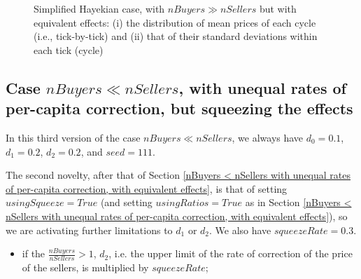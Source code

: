 \documentclass[10pt]{report}
\begin{document}
\begin{appendices}
\begin{figure}[H]
\begin{center}
\caption{Simplified Hayekian case, with $nBuyers \gg nSellers$ but with equivalent effects: (i) the distribution of mean prices of each cycle (i.e., tick-by-tick) and (ii) that of their standard deviations within each tick (cycle)}
\label{output_3_3bb.png}
\end{center}
\end{figure}


\subsection{Case $nBuyers \ll nSellers$, with unequal rates of per-capita correction, but squeezing the effects}\label{nBuyers < nSellerswith unequal rates of per-capita correction, but squeezing the effects}

In this third version of the case $nBuyers \ll nSellers$, we always have $d_0=0.1$, $d_1=0.2$,  $d_2=0.2$, and $seed=111$.

The second novelty, after that of Section \ref{nBuyers < nSellers with unequal rates of per-capita correction, with equivalent effects}, is that of setting $usingSqueeze=True$ (and setting $usingRatios=True$ as in Section  \ref{nBuyers < nSellers with unequal rates of per-capita correction, with equivalent effects}), so we are activating further limitations to $d_1$ or $d_2$. We also have $squeezeRate=0.3$.

\begin{itemize}

\item if the $\frac{nBuyers}{nSellers}>1$, $d_2$, i.e. the upper limit of the rate of correction of the price of the sellers, is multiplied by $squeezeRate$;


\end{itemize}
\end{appendices}
\end{document}
